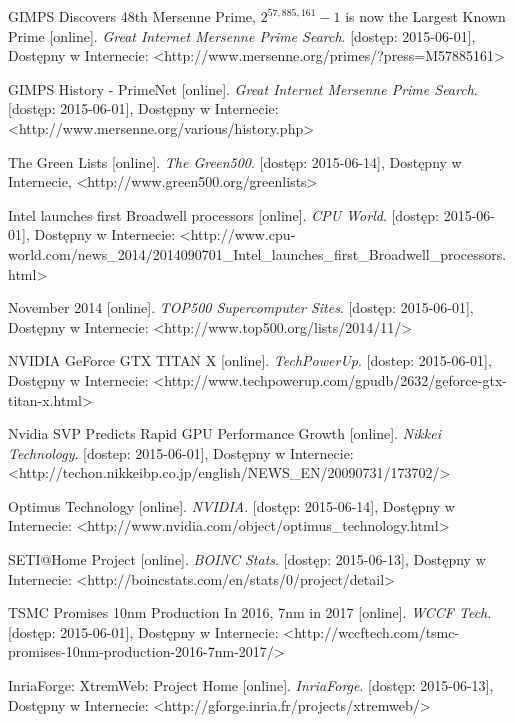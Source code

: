 \documentclass[12pt,a4paper,twoside]{article}
\begin{document}
\begin{thebibliography}{99}

 GIMPS Discovers 48th Mersenne Prime, $2^{57,885,161}-1$ is now the Largest Known Prime [online].\textit{ Great Internet Mersenne Prime Search}. [dostęp: 2015-06-01], Dostępny w Internecie: <http://www.mersenne.org/primes/?press=M57885161>

 GIMPS History - PrimeNet [online].\textit{ Great Internet Mersenne Prime Search}. [dostęp: 2015-06-01], Dostępny w Internecie: <http://www.mersenne.org/various/history.php>

 The Green Lists [online]. \textit{The Green500}. [dostęp: 2015-06-14], Dostępny w Internecie, <http://www.green500.org/greenlists>

 Intel launches first Broadwell processors [online]. \textit{CPU World}. [dostęp: 2015-06-01], Dostępny w Internecie: <http://www.cpu-world.com/news\_2014/2014090701\_Intel\_launches\_first\_Broadwell\_processors.html>

 November 2014 [online]. \textit{TOP500 Supercomputer Sites}. [dostęp: 2015-06-01], Dostępny w Internecie: <http://www.top500.org/lists/2014/11/>

 NVIDIA GeForce GTX TITAN X [online]. \textit{TechPowerUp}. [dostep: 2015-06-01], Dostępny w Internecie: <http://www.techpowerup.com/gpudb/2632/geforce-gtx-titan-x.html>

 Nvidia SVP Predicts Rapid GPU Performance Growth [online]. \textit{Nikkei Technology}. [dostep: 2015-06-01], Dostępny w Internecie: <http://techon.nikkeibp.co.jp/english/NEWS\_EN/20090731/173702/>

 Optimus Technology [online]. \textit{NVIDIA}. [dostęp: 2015-06-14], Dostępny w Internecie: <http://www.nvidia.com/object/optimus\_technology.html>

 SETI@Home Project [online]. \textit{BOINC Stats}. [dostęp: 2015-06-13], Dostępny w Internecie: <http://boincstats.com/en/stats/0/project/detail>

 TSMC Promises 10nm Production In 2016, 7nm in 2017 [online]. \textit{WCCF Tech}. [dostęp: 2015-06-01], Dostępny w Internecie: <http://wccftech.com/tsmc-promises-10nm-production-2016-7nm-2017/>

 InriaForge: XtremWeb: Project Home [online]. \textit{InriaForge}. [dostęp: 2015-06-13], Dostępny w Internecie: <http://gforge.inria.fr/projects/xtremweb/>

\end{thebibliography}
\endgroup
\end{document}
